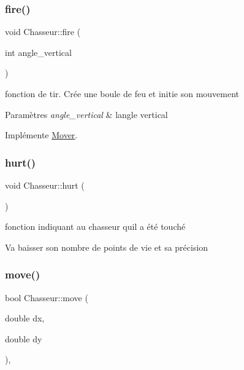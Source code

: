 \subsubsection{\texorpdfstring{fire()}{fire()}}
{\footnotesize\ttfamily void Chasseur\+::fire (\begin{DoxyParamCaption}\item[{int}]{angle\+\_\+vertical }\end{DoxyParamCaption})\hspace{0.3cm}{\ttfamily [virtual]}}



fonction de tir. Crée une boule de feu et initie son mouvement 


\begin{DoxyParams}{Paramètres}
{\em angle\+\_\+vertical} & l\textquotesingle{}angle vertical \\
\hline
\end{DoxyParams}


Implémente \hyperlink{classMover_a670fb72f8e496de3420b89c84def7418}{Mover}.

\mbox{\label{classChasseur_ac75a09254dea5b1d25c7dbf49809a273}} 
\subsubsection{\texorpdfstring{hurt()}{hurt()}}
{\footnotesize\ttfamily void Chasseur\+::hurt (\begin{DoxyParamCaption}{ }\end{DoxyParamCaption})}



fonction indiquant au chasseur qu\textquotesingle{}il a été touché 

Va baisser son nombre de points de vie et sa précision \mbox{\label{classChasseur_ac5275e34388084bc3ca2114b45a0b725}} 
\subsubsection{\texorpdfstring{move()}{move()}}
{\footnotesize\ttfamily bool Chasseur\+::move (\begin{DoxyParamCaption}\item[{double}]{dx,  }\item[{double}]{dy }\end{DoxyParamCaption})\hspace{0.3cm}{\ttfamily [inline]}, {\ttfamily [virtual]}}



